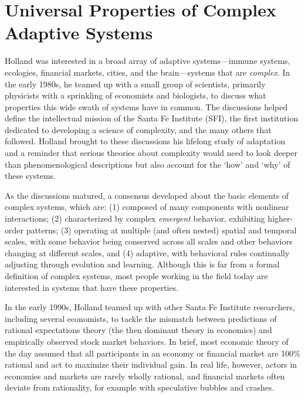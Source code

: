 \documentclass{sig-alternate}
\begin{document}
\section{Universal Properties of Complex Adaptive Systems}

Holland was interested in a broad array of adaptive systems---immune
systems, ecologies, financial markets, cities, and the brain---systems
that are \emph{complex}.  In the early 1980s, he teamed up with a small
group of scientists, primarily physicists with a sprinkling of
economists and biologists, to discuss what properties this wide swath of systems
have in common.  The discussions helped define the intellectual mission
of the Santa Fe Institute (SFI), the first institution dedicated to
developing a science of complexity, and the many others that followed.
Holland brought to these discussions his lifelong study of
adaptation and a reminder that serious theories about complexity would
need to look deeper than phenomenological descriptions but also
account for the `how' and `why' of these systems.

As the discussions matured, a consensus developed about the basic
elements of complex systems, which are: (1) 
composed of many
components with nonlinear interactions; (2) 
characterized by complex \emph{emergent} behavior, exhibiting
higher-order patterns; (3) 
operating at multiple (and often
nested) spatial and temporal scales, with some behavior being
conserved across all scales and other behaviors changing at different
scales, and (4) 
adaptive, with 
behavioral rules continually adjusting through evolution and learning.  Although this
is far from a formal definition of complex systems, most people
working in the field today are interested in systems that have these
properties.


In the early 1990s, Holland teamed up with other Santa Fe Institute researchers,
including several economists, to tackle the mismatch between predictions
of rational expectations theory (the then dominant theory in economics) 
and empirically observed stock market behaviors. 
In brief, most
economic theory of the day assumed that all participants in an economy
or financial market are 100\% rational and act to maximize their
individual gain.  In real life, however, actors in economies
and markets are rarely wholly rational, and financial markets often deviate
from rationality, for example with speculative bubbles and crashes.
\end{document}
